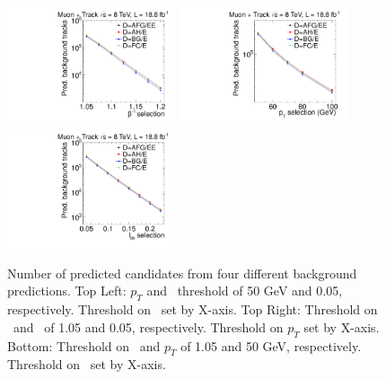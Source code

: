 \begin{figure}
 \begin{center}
  \includegraphics[clip=true, trim=0.0cm 0cm 2.8cm 0cm,width=0.44\textwidth]{figures/tkmu/Systematics_Data8TeV_TOF_Value}
  \includegraphics[clip=true, trim=0.0cm 0cm 2.8cm 0cm,width=0.44\textwidth]{figures/tkmu/Systematics_Data8TeV_P_Value} \\
  \includegraphics[clip=true, trim=0.0cm 0cm 2.8cm 0cm,width=0.44\textwidth]{figures/tkmu/Systematics_Data8TeV_I_Value}
 \end{center}
 \caption[Number of predicted candidates from four different background predictions in the \tktof\ analysis]
{Number of predicted candidates from four different background predictions. Top Left: $p_T$ and \ias\ threshold of 50 GeV and 0.05, respectively.
Threshold on \invbeta\ set by X-axis. Top Right: Threshold on \invbeta\  and \ias\ of 1.05 and 0.05, respectively. Threshold on $p_T$ set by X-axis.
Bottom: Threshold on \invbeta\ and $p_T$ of 1.05 and 50 GeV, respectively. Threshold on \ias\ set by X-axis. }
\label{fig:TkMuMultPred}
\end{figure}

